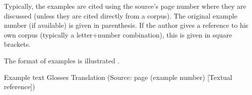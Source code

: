   Typically, the examples are cited using the source's page number where they are discussed (unless they are cited directly from a corpus). The original example number (if available) is given in parenthesis. If the author gives a reference to his own corpus (typically a letter+number combination), this is given in square brackets.
  
  The format of examples is illustrated .




{Example text}
{Glosses}
{Translation}
{}{(Source: page (example number) [Textual reference])}

